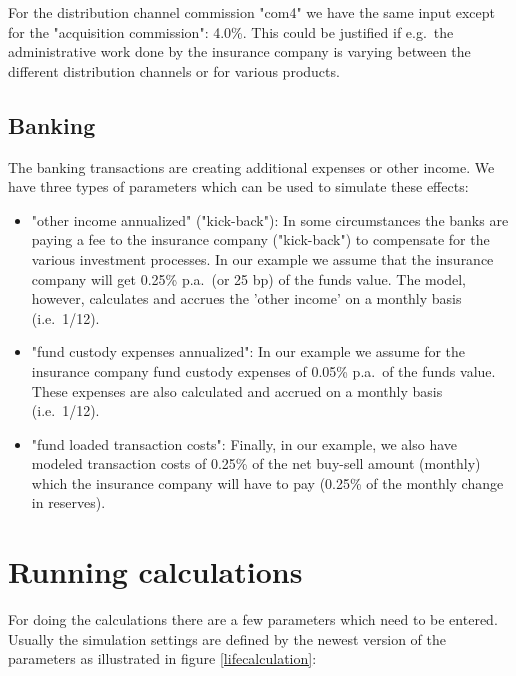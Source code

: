 For the distribution channel commission "com4" we have the same input except for the "acquisition commission": 4.0\%. This could be justified if e.g.~the administrative work done by the insurance company is varying between the different distribution channels or for various products.

\subsection{Banking}

The banking transactions are creating additional expenses or other income. We have three types of parameters which can be used to simulate these effects:
\begin{itemize}
	\item "other income annualized" ("kick-back"): In some circumstances the banks are paying a fee to the insurance company ("kick-back") to compensate for the various investment processes. In our example we assume that the insurance company will get 0.25\% p.a.~(or 25 bp) of the funds value. The model, however, calculates and accrues the 'other income' on a monthly basis (i.e.~1/12).
\item "fund custody expenses annualized": In our example we assume for the insurance company fund custody expenses of 0.05\% p.a.~of the funds value. These expenses are also calculated and accrued on a monthly basis (i.e.~1/12).
\item "fund loaded transaction costs": Finally, in our example, we also have modeled transaction costs of 0.25\% of the net buy-sell amount (monthly) which the insurance company will have to pay (0.25\% of the monthly change in reserves).
\end{itemize}

\section{Running calculations}

For doing the calculations there are a few parameters which need to be entered. Usually the simulation settings are defined by the newest version of the parameters as illustrated in figure \ref{lifecalculation}:

